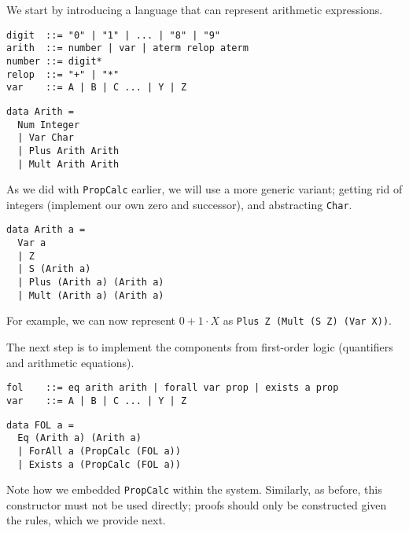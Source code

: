 \documentclass{article}
\begin{document}
We start by introducing a language that can represent arithmetic expressions.

\begin{minipage}{0.49\textwidth}
\begin{lstlisting}
digit  ::= "0" | "1" | ... | "8" | "9"
arith  ::= number | var | aterm relop aterm
number ::= digit*
relop  ::= "+" | "*"
var    ::= A | B | C ... | Y | Z
\end{lstlisting}
\end{minipage}
\begin{minipage}{0.49\textwidth}
\begin{lstlisting}
data Arith =
  Num Integer
  | Var Char
  | Plus Arith Arith
  | Mult Arith Arith
\end{lstlisting}
\end{minipage}

As we did with \texttt{PropCalc} earlier, we will use a more generic variant; getting rid of integers (implement our own zero and successor), and abstracting \texttt{Char}.

\begin{lstlisting}
data Arith a =
  Var a
  | Z
  | S (Arith a)
  | Plus (Arith a) (Arith a)
  | Mult (Arith a) (Arith a)
\end{lstlisting}

For example, we can now represent $0 + 1 \cdot X$ as \texttt{Plus Z (Mult (S Z) (Var X))}.

The next step is to implement the components from first-order logic (quantifiers and arithmetic equations).

\begin{minipage}{0.49\textwidth}
\begin{lstlisting}
fol    ::= eq arith arith | forall var prop | exists a prop
var    ::= A | B | C ... | Y | Z
\end{lstlisting}
\end{minipage}
\begin{minipage}{0.49\textwidth}
\begin{lstlisting}
data FOL a =
  Eq (Arith a) (Arith a)
  | ForAll a (PropCalc (FOL a))
  | Exists a (PropCalc (FOL a))
\end{lstlisting}
\end{minipage}

Note how we embedded \texttt{PropCalc} within the system. Similarly, as before, this constructor must not be used directly; proofs should only be constructed given the rules, which we provide next.
\end{document}
